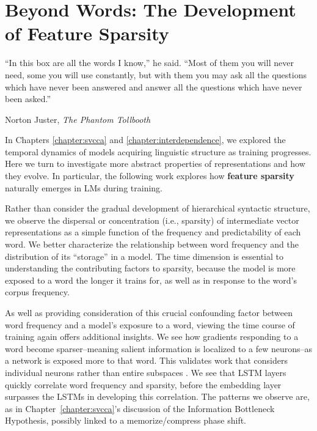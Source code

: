 \chapter{Beyond Words: The Development of Feature Sparsity} \label{chapter:sparsity}

\epigraph{``In this box are all the words I know,'' he said. ``Most of them you will never need, some you will use constantly, but with them you may ask all the questions which have never been answered and answer all the questions which have never been asked.''
}{Norton Juster, \textit{The Phantom Tollbooth}}

In Chapters \ref{chapter:svcca} and \ref{chapter:interdependence}, we explored the temporal dynamics of models acquiring linguistic structure as training progresses. Here we turn to investigate more abstract properties of representations and how they evolve. In particular, the following work explores how \textbf{feature sparsity} naturally emerges in LMs during training. 

Rather than consider the gradual development of hierarchical syntactic structure, we observe the dispersal or concentration (i.e., sparsity) of intermediate vector representations as a simple function of the frequency and predictability of each word. We better characterize the relationship between word frequency and the distribution of its ``storage'' in a model. The time dimension is essential to understanding the contributing factors to sparsity, because the model is more exposed to a word the longer it trains for, as well as in response to the word's corpus frequency. 

As well as providing consideration of this crucial confounding factor between word frequency and a model's exposure to a word, viewing the time course of training again offers additional insights. We see how gradients responding to a word become sparser--meaning salient information is localized to a few neurons--as a network is exposed more to that word. This validates work that considers individual neurons rather than entire subspaces \citep{hennigen_intrinsic_2020,durrani_analyzing_2020,dalvi_what_2018}. We see that LSTM layers quickly correlate word frequency and sparsity, before the embedding layer surpasses the LSTMs in developing this correlation. The patterns we observe are, as in Chapter~\ref{chapter:svcca}'s discussion of the Information Bottleneck Hypothesis, possibly linked to a memorize/compress phase shift. 


